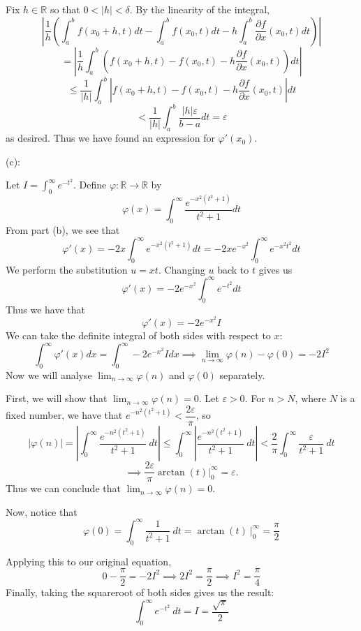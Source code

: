 \documentclass{article}
\theoremstyle{plain} %
\numberwithin{thm}{section} %
\theoremstyle{definition}
\begin{document}
\begin{question}{27}
    Fix \(h \in \mathbb{R}\) so that \(0 < |h| <\delta\). By the linearity of the integral,
    \[
        \left\vert \frac{1}{h} \left(\int _a^b f(x_0 + h,t)dt - \int _a^b f(x_0, t)dt - h\int _a^b \frac{\partial f}{\partial x} (x_0,t)dt\right) \right\vert
    \]
    \[
        = \left\vert\frac{1}{h}\int _a^b (f(x_0 + h, t) - f(x_0, t) - h\frac{\partial f}{\partial x} (x_0,t))dt\right\vert 
    \]
    \[
        \leq \frac{1}{|h|} \int _a^b \left\vert f(x_0 + h, t) - f(x_0, t) - h\frac{\partial f}{\partial x} (x_0,t) \right\vert dt
    \]
    \[
        < \frac{1}{|h|}\int _a^b \frac{|h|\varepsilon}{b-a}dt =\varepsilon
    \]
    as desired. Thus we have found an expression for \(\varphi ' (x_0)\).

    (c):

    Let \(I = \int _0^{\infty} e^{-t^2}\). Define \(\varphi : \mathbb{R} \to  \mathbb{R}\) by
    \[
        \varphi (x) = \int _0^{\infty} \frac{e^{-x^2(t^2 + 1)}}{t^{2} +1}dt
    \]
    From part (b), we see that
    \[
        \varphi '(x) = -2x\int _0^{\infty} e^{-x^2 (t^2 + 1)}dt = -2xe^{-x^2}\int _0^{\infty} e^{-x^2 t^2}dt
    \]
    We perform the substitution \(u = xt\). Changing \(u\) back to \(t\) gives us
    \[
        \varphi '(x) = -2e^{-x^2}\int _0^{\infty} e^{-t^2}dt
    \]
    Thus we have that
    \[
        \varphi '(x) = -2e^{-x^2}I
    \]
    We can take the definite integral of both sides with respect to \(x\):
    \[
        \int _0 ^{\infty} \varphi '(x) dx = \int _0^{\infty} -2e^{-x^2}I dx \implies \lim_{n \to \infty} \varphi (n) - \varphi (0) = -2I^2
    \]
    Now we will analyse \(\lim_{n \to \infty} \varphi (n)\) and \(\varphi (0)\) separately.

    First, we will show that \(\lim_{n \to \infty} \varphi (n) = 0\). Let \(\varepsilon > 0\). For \(n > N\), where \(N\) is a fixed number, we have that \(e^{-n^2(t^2 +1)} < \dfrac{2\varepsilon}{\pi}\), so
    \[
        |\varphi (n)| = \left\vert \int _0^{\infty} \frac{e^{-n^2(t^2 + 1)}}{t^{2} +1}\ dt \right\vert \leq \int _0^{\infty} \left\vert \frac{e^{-n^2(t^2 + 1)}}{t^{2} +1}\ dt \right\vert < \frac{2}{\pi} \int _0^{\infty} \frac{\varepsilon}{t^2 + 1}\ dt
    \]
    \[
        \implies \frac{2\varepsilon}{\pi} \arctan (t) \Big| _0^{\infty} = \varepsilon.
    \]
    Thus we can conclude that \(\lim_{n \to \infty} \varphi (n) = 0\).

    Now, notice that
    \[
        \varphi (0) = \int _0^{\infty} \frac{1}{t^2 + 1} \ dt = \arctan (t) \ \Big|_0^{\infty} = \frac{\pi}{2}
    \]

    Applying this to our original equation,
    \[
        0 - \frac{\pi}{2} = -2I^2 \implies 2I^2 = \frac{\pi}{2} \implies I^2 = \frac{\pi}{4}
    \]
    Finally, taking the squareroot of both sides gives us the result:
    \[
        \int_0^\infty e^{- t^2} \ dt = I = \frac{\sqrt{\pi}}{2}
    \]
    \end{question}
\end{document}

